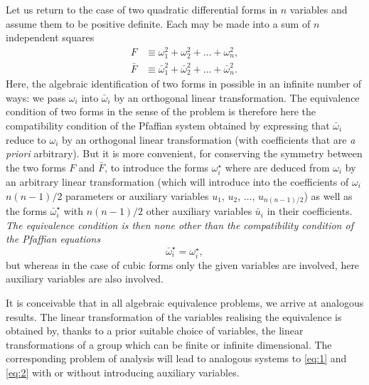 \documentclass[leqno,11pt]{article}
\theoremstyle{shape1}
\theoremstyle{shape0}
\theoremstyle{shape2}
\theoremstyle{definition}
\begin{document}
Let us return to the case of two quadratic differential forms in $n$ variables and assume them to be positive definite. Each may be made into a sum of $n$ independent squares
\begin{align*}
  F&\equiv\omega_{1}^{2}+\omega_{2}^{2}+\dots+\omega_{n}^{2},\\
  \bar F&\equiv\bar\omega_{1}^{2}+\bar\omega_{2}^{2}+\dots+\bar\omega_{n}^{2}.
\end{align*}
Here, the algebraic identification of two forms in possible in an infinite number of ways: we pass $\omega_{i}$ into $\bar \omega_{i}$ by an orthogonal linear transformation. The equivalence condition of two forms in the sense of the problem is therefore here the compatibility condition of the Pfaffian system obtained by expressing that $\bar \omega_{i}$ reduce to $\omega_{i}$ by an orthogonal linear transformation (with coefficients that are \emph{a priori} arbitrary). But it is more convenient, for conserving the symmetry between the two forms $F$ and $\bar F$, to introduce the forms $\omega_{i}^{\star}$ where are deduced from $\omega_{i}$ by an arbitrary linear transformation (which will introduce into the coefficients of $\omega_{i}$ $n(n-1)/2$ parameters or auxiliary variables $u_{1}$, $u_{2}$, $\dots$, $u_{n(n-1)/2}$) as well as the forms $\bar\omega^{\star}_{i}$ with $n(n-1)/2$ other auxiliary variables $\bar u_{i}$ in their coefficients. \emph{The equivalence condition is then none other than the compatibility condition of the Pfaffian equations}
\begin{equation}
  \label{eq:2}
  \bar\omega_{i}^{\star}=\omega_{i}^{\star},
\end{equation}
but whereas in the case of cubic forms only the given variables are involved, here auxiliary variables are also involved.

It is conceivable that in all algebraic equivalence problems, we arrive at analogous results. The linear transformation of the variables realising the equivalence is obtained by, thanks to a prior suitable choice of variables, the linear transformations of a group which can be finite or infinite dimensional. The corresponding problem of analysis will lead to analogous systems to \eqref{eq:1} and \eqref{eq:2} with or without introducing auxiliary variables.
\end{document}

